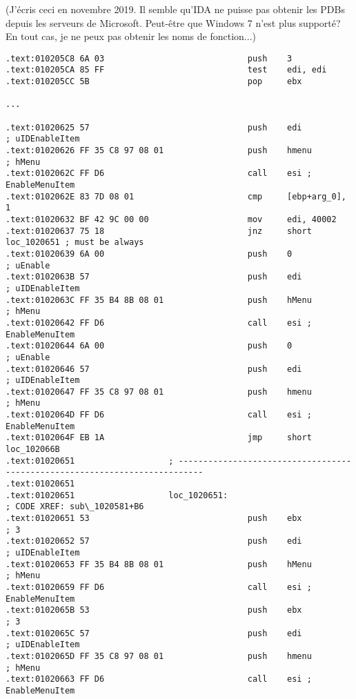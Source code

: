 (J'écris ceci en novembre 2019. Il semble qu'IDA ne puisse pas obtenir les PDBs
depuis les serveurs de Microsoft. Peut-être que Windows 7 n'est plus supporté?
En tout cas, je ne peux pas obtenir les noms de fonction...)

\begin{lstlisting}[style=customasmx86,caption=Mahjong.exe]
.text:010205C8 6A 03                             push    3
.text:010205CA 85 FF                             test    edi, edi
.text:010205CC 5B                                pop     ebx

...

.text:01020625 57                                push    edi             ; uIDEnableItem
.text:01020626 FF 35 C8 97 08 01                 push    hmenu           ; hMenu
.text:0102062C FF D6                             call    esi ; EnableMenuItem
.text:0102062E 83 7D 08 01                       cmp     [ebp+arg_0], 1
.text:01020632 BF 42 9C 00 00                    mov     edi, 40002
.text:01020637 75 18                             jnz     short loc_1020651 ; must be always
.text:01020639 6A 00                             push    0               ; uEnable
.text:0102063B 57                                push    edi             ; uIDEnableItem
.text:0102063C FF 35 B4 8B 08 01                 push    hMenu           ; hMenu
.text:01020642 FF D6                             call    esi ; EnableMenuItem
.text:01020644 6A 00                             push    0               ; uEnable
.text:01020646 57                                push    edi             ; uIDEnableItem
.text:01020647 FF 35 C8 97 08 01                 push    hmenu           ; hMenu
.text:0102064D FF D6                             call    esi ; EnableMenuItem
.text:0102064F EB 1A                             jmp     short loc_102066B
.text:01020651                   ; ---------------------------------------------------------------------------
.text:01020651
.text:01020651                   loc_1020651:                            ; CODE XREF: sub\_1020581+B6
.text:01020651 53                                push    ebx             ; 3
.text:01020652 57                                push    edi             ; uIDEnableItem
.text:01020653 FF 35 B4 8B 08 01                 push    hMenu           ; hMenu
.text:01020659 FF D6                             call    esi ; EnableMenuItem
.text:0102065B 53                                push    ebx             ; 3
.text:0102065C 57                                push    edi             ; uIDEnableItem
.text:0102065D FF 35 C8 97 08 01                 push    hmenu           ; hMenu
.text:01020663 FF D6                             call    esi ; EnableMenuItem
\end{lstlisting}

